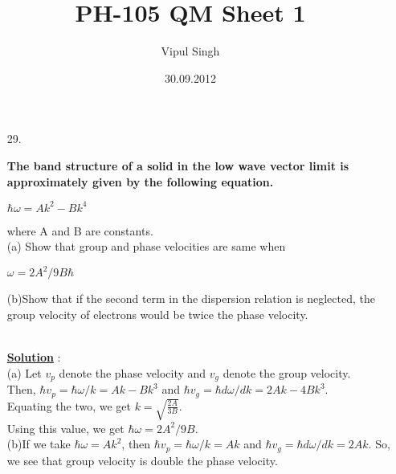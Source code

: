 \documentclass[10pt, a4paper]{article}
\begin{document}
\title{PH-105 QM Sheet 1}
\date{30.09.2012}
\author{Vipul Singh}
\maketitle
\begin{enumerate}
\item[29.]{\bf The band structure of a solid in the low wave vector limit is approximately given by the following equation.
\begin{center}
$\hbar\omega=Ak^{2}-Bk^{4}$
\end{center}
where A and B are constants.\\
(a) Show that group and phase velocities are same when
\begin{center}
$\omega=2A^{2}/9B\hbar$
\end{center}
(b)Show that if the second term in the dispersion relation is neglected, the group velocity of electrons would be twice the phase velocity. 
}\\

{\underline {\bf Solution}} : \\
(a) Let $v_{p}$ denote the phase velocity and $v_{g}$ denote the group velocity.\\
Then, $\hbar v_{p}=\hbar\omega/k=Ak-Bk^{3}$ and $\hbar v_{g}=\hbar d\omega/dk=2Ak-4Bk^{3}$.\\
Equating the two, we get $k=\sqrt{\frac{2A}{3B}}$.\\
Using this value, we get $\hbar\omega=2A^{2}/9B$.\\
(b)If we take $\hbar\omega=Ak^{2}$, then $\hbar v_{p}=\hbar\omega/k=Ak$ and $\hbar v_{g}=\hbar d\omega/dk=2Ak$. So, we see that group velocity is double the phase velocity.
\end{enumerate}
\end{document}
